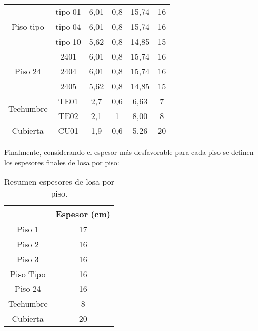 \documentclass[letterpaper,11pt]{article} %
\begin{document}
\begin{itemize}
\begin{table}[H]
\begin{tabular}{|c|ccccc|}
        \hline
        \multirow{3}[2]{*}{Piso tipo} &
          tipo 01 &
          6,01 &
          0,8 &
          15,74 &
          16
          \bigstrut[t]\\
         &
          tipo 04  &
          6,01 &
          0,8 &
          15,74 &
          16
          \\
         &
          tipo 10 &
          5,62 &
          0,8 &
          14,85 &
          15
          \bigstrut[b]\\
        \hline
        \multirow{3}[2]{*}{Piso 24} &
          2401 &
          6,01 &
          0,8 &
          15,74 &
          16
          \bigstrut[t]\\
         &
          2404 &
          6,01 &
          0,8 &
          15,74 &
          16
          \\
         &
          2405 &
          5,62 &
          0,8 &
          14,85 &
          15
          \bigstrut[b]\\
        \hline
        \multirow{2}[2]{*}{Techumbre} &
          TE01 &
          2,7 &
          0,6 &
          6,63 &
          7
          \bigstrut[t]\\
         &
          TE02 &
          2,1 &
          1 &
          8,00 &
          8
          \bigstrut[b]\\
        \hline
        Cubierta  &
          CU01 &
          1,9 &
          0,6 &
          5,26 &
          20
          \bigstrut\\
        \hline
        \end{tabular}%
    \end{table}%

    Finalmente, considerando el espesor más desfavorable para cada piso se definen los espesores finales de losa por piso:
    
    \begin{table}[H]
      \centering
      \caption{Resumen espesores de losa por piso.}
        \begin{tabular}{|c|c|}
    \cline{2-2}    \multicolumn{1}{c|}{} &
          Espesor (cm)
          \bigstrut\\
        \hline
        Piso 1 &
          17
          \bigstrut[t]\\
        Piso 2  &
          16
          \\
        Piso 3  &
          16
          \\
        Piso Tipo &
          16
          \\
        Piso 24 &
          16
          \\
        Techumbre  &
          8
          \\
        Cubierta &
          20
          \bigstrut[b]\\
        \hline
        \end{tabular}%
    \end{table}%
\end{itemize}
\end{document}
